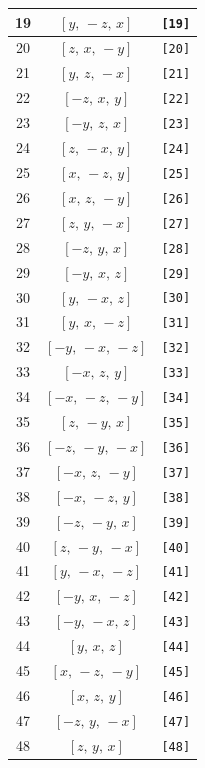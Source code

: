 \documentclass[fleqn,8pt]{jsarticle}
\begin{document}
\begin{longtable}{ccc}
19 & $\left[ y,\, - z,\, x \right]$ & {\tt [19]} \\ \hline
20 & $\left[ z,\, x,\, - y \right]$ & {\tt [20]} \\ \hline
21 & $\left[ y,\, z,\, - x \right]$ & {\tt [21]} \\ \hline
22 & $\left[ - z,\, x,\, y \right]$ & {\tt [22]} \\ \hline
23 & $\left[ - y,\, z,\, x \right]$ & {\tt [23]} \\ \hline
24 & $\left[ z,\, - x,\, y \right]$ & {\tt [24]} \\ \hline
25 & $\left[ x,\, - z,\, y \right]$ & {\tt [25]} \\ \hline
26 & $\left[ x,\, z,\, - y \right]$ & {\tt [26]} \\ \hline
27 & $\left[ z,\, y,\, - x \right]$ & {\tt [27]} \\ \hline
28 & $\left[ - z,\, y,\, x \right]$ & {\tt [28]} \\ \hline
29 & $\left[ - y,\, x,\, z \right]$ & {\tt [29]} \\ \hline
30 & $\left[ y,\, - x,\, z \right]$ & {\tt [30]} \\ \hline
31 & $\left[ y,\, x,\, - z \right]$ & {\tt [31]} \\ \hline
32 & $\left[ - y,\, - x,\, - z \right]$ & {\tt [32]} \\ \hline
33 & $\left[ - x,\, z,\, y \right]$ & {\tt [33]} \\ \hline
34 & $\left[ - x,\, - z,\, - y \right]$ & {\tt [34]} \\ \hline
35 & $\left[ z,\, - y,\, x \right]$ & {\tt [35]} \\ \hline
36 & $\left[ - z,\, - y,\, - x \right]$ & {\tt [36]} \\ \hline
37 & $\left[ - x,\, z,\, - y \right]$ & {\tt [37]} \\ \hline
38 & $\left[ - x,\, - z,\, y \right]$ & {\tt [38]} \\ \hline
39 & $\left[ - z,\, - y,\, x \right]$ & {\tt [39]} \\ \hline
40 & $\left[ z,\, - y,\, - x \right]$ & {\tt [40]} \\ \hline
41 & $\left[ y,\, - x,\, - z \right]$ & {\tt [41]} \\ \hline
42 & $\left[ - y,\, x,\, - z \right]$ & {\tt [42]} \\ \hline
43 & $\left[ - y,\, - x,\, z \right]$ & {\tt [43]} \\ \hline
44 & $\left[ y,\, x,\, z \right]$ & {\tt [44]} \\ \hline
45 & $\left[ x,\, - z,\, - y \right]$ & {\tt [45]} \\ \hline
46 & $\left[ x,\, z,\, y \right]$ & {\tt [46]} \\ \hline
47 & $\left[ - z,\, y,\, - x \right]$ & {\tt [47]} \\ \hline
48 & $\left[ z,\, y,\, x \right]$ & {\tt [48]} \\
\end{longtable}
\end{document}
